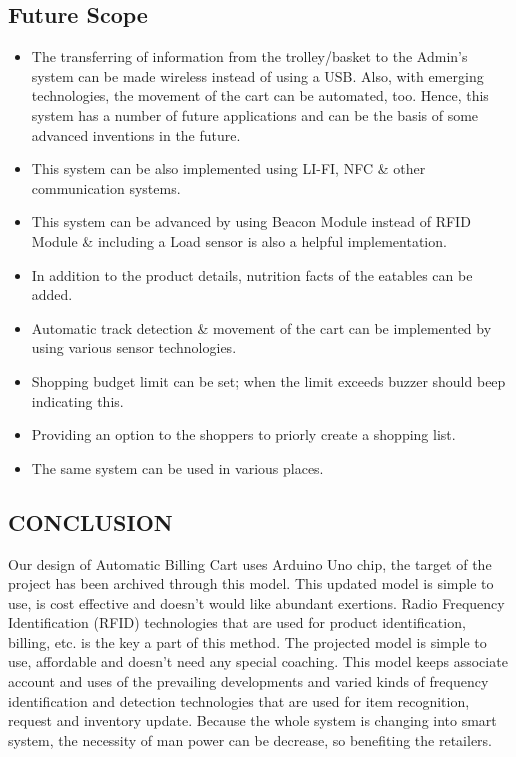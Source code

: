 \documentclass[12pt]{article}
\begin{document}
\subsection{Future Scope}
\begin{itemize}
\item The transferring of information from the trolley/basket to the Admin’s system can be made wireless instead of using a USB. Also, with emerging technologies, the movement of the cart can be automated, too. Hence, this system has a number of future applications and can be the basis of some advanced
inventions in the future.
\item This system can be also implemented using LI-FI, NFC \& other communication systems.
\item This system can be advanced by using Beacon Module instead of RFID Module \& including a Load sensor is also a helpful implementation.
\item In addition to the product details, nutrition facts of the eatables can be added.
\item Automatic track detection \& movement of the cart can be implemented by using various sensor technologies.
\item Shopping budget limit can be set; when the limit exceeds buzzer should beep indicating this.
\item Providing an option to the shoppers to priorly create a shopping list.
\item The same system can be used in various places.
\end{itemize}
\newpage
\begin{center}
\section{CONCLUSION}
\end{center}
\hspace*{1 cm}Our design of Automatic Billing Cart uses Arduino Uno chip, the target of the project has been archived through this model. This updated model is simple to use, is cost effective and doesn't would like abundant exertions. Radio Frequency Identification (RFID) technologies that are used for product identification, billing, etc. is the key a part of this method. The projected model is simple to use, affordable and doesn't need any special coaching. This model keeps associate account and uses of the prevailing developments and varied kinds of frequency identification and detection technologies that are used for item recognition, request and inventory update. Because the whole system is changing into smart system, the necessity of man power can be decrease, so benefiting the retailers.\\
\end{document}
